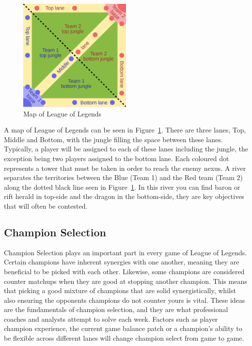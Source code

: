 \begin{figure}[h!]
    \centering
    \includegraphics[width=0.5\textwidth]{figures/MOBAMap}
    \caption{Map of League of Legends}
    \label{fig:Lolmap}
\end{figure}

A map of League of Legends can be seen in Figure~\ref{fig:Lolmap}.
There are three lanes, Top, Middle and Bottom, with the \gls{jungle} filling the space between these lanes.
Typically, a player will be assigned to each of these lanes including the jungle, the exception being two players assigned to the bottom lane.
Each coloured dot represents a \gls{tower} that must be taken in order to reach the enemy \Gls{nexus}.
A river separates the territories between the Blue (Team 1) and the Red team (Team 2) along the dotted black line seen in Figure~\ref{fig:Lolmap}.
In this river you can find \Gls{baron} or \Gls{rift herald} in top-side and the \Gls{dragon} in the bottom-side, they are key objectives that will often be contested.

\subsection{Champion Selection}\label{subsec:champ-select}

Champion Selection plays an important part in every game of League of Legends.
Certain champions have inherent synergies with one another, meaning they are beneficial to be picked with each other.
Likewise, some champions are considered counter matchups when they are good at stopping another champion.
This means that picking a good mixture of \glspl{champion} that are solid synergistically, whilst also ensuring the opponents \glspl{champion} do not counter yours is vital.
These ideas are the fundamentals of champion selection, and they are what professional coaches and analysts attempt to solve each week.
Factors such as player champion experience, the current game balance \gls{patch} or a champion's ability to be flexible across different lanes will change champion select from game to game. \\

